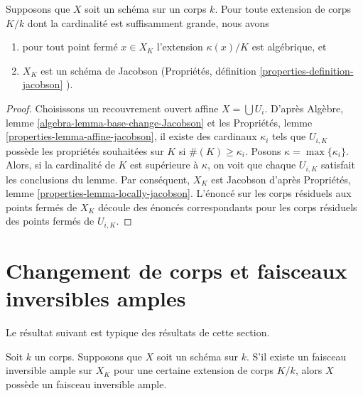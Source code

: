 \begin{lemma}
\label{lemma-make-Jacobson}
Supposons que $X$ soit un schéma sur un corps
$k$. Pour toute extension de corps $K/k$ dont la
cardinalité est suffisamment grande, nous avons
\begin{enumerate}
\item pour tout point fermé $x \in X_K$
l'extension $\kappa(x)/K$ est algébrique, et
\item $X_K$ est un schéma de Jacobson (Propriétés,
définition \ref{properties-definition-jacobson} ).
\end{enumerate}
\end{lemma}

\begin{proof}
Choisissons un recouvrement ouvert affine $X =
\bigcup U_i$. D'après Algèbre, lemme
\ref{algebra-lemma-base-change-Jacobson} et les
Propriétés, lemme
\ref{properties-lemma-affine-jacobson}, il existe des
cardinaux $\kappa_i$ tels que $U_{i, K}$ possède les
propriétés souhaitées sur $K$ si $\#(K) \geq \kappa_i$.
Posons $\kappa = \max\{\kappa_i\}$. Alors, si la cardinalité
de $K$ est supérieure à $\kappa$, on voit que chaque
$U_{i, K}$ satisfait les conclusions du lemme. Par
conséquent, $X_K$ est Jacobson d'après Propriétés, lemme
\ref{properties-lemma-locally-jacobson}. L'énoncé sur les corps
résiduels aux points fermés de $X_K$ découle des énoncés
correspondants pour les corps résiduels des points fermés de $U_{i, K}$.
\end{proof}





\section{Changement de corps et faisceaux inversibles amples}
\label{section-change-fields-ample}

\noindent
Le résultat suivant est typique des résultats de cette section.

\begin{lemma}
\label{lemma-ample-after-field-extension}
Soit $k$ un corps. Supposons que $X$ soit
un schéma sur $k$. S'il existe un faisceau inversible
ample sur $X_K$ pour une certaine extension de corps
$K/k$, alors $X$ possède un faisceau inversible ample.
\end{lemma}

